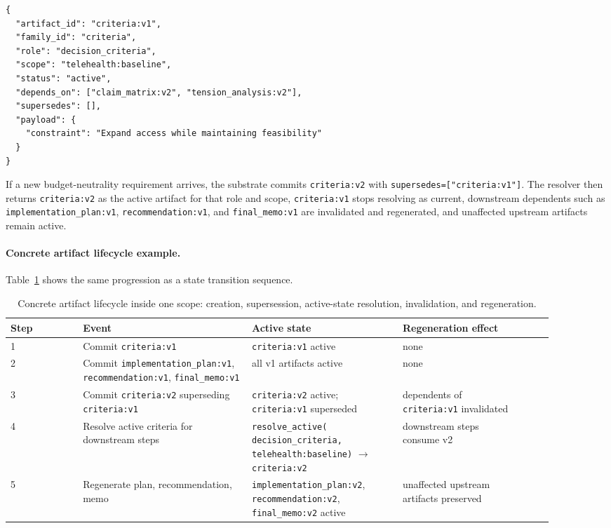 \documentclass{article}
\begin{document}
\begin{verbatim}
{
  "artifact_id": "criteria:v1",
  "family_id": "criteria",
  "role": "decision_criteria",
  "scope": "telehealth:baseline",
  "status": "active",
  "depends_on": ["claim_matrix:v2", "tension_analysis:v2"],
  "supersedes": [],
  "payload": {
    "constraint": "Expand access while maintaining feasibility"
  }
}
\end{verbatim}

If a new budget-neutrality requirement arrives, the substrate commits \texttt{criteria:v2} with \texttt{supersedes=["criteria:v1"]}. The resolver then returns \texttt{criteria:v2} as the active artifact for that role and scope, \texttt{criteria:v1} stops resolving as current, downstream dependents such as \texttt{implementation\_plan:v1}, \texttt{recommendation:v1}, and \texttt{final\_memo:v1} are invalidated and regenerated, and unaffected upstream artifacts remain active.

\paragraph{Concrete artifact lifecycle example.} Table~\ref{tab:lifecycle-example} shows the same progression as a state transition sequence.
\begin{table}[H]
\centering
\small
\begin{tabular}{p{0.12\linewidth}p{0.28\linewidth}p{0.25\linewidth}p{0.25\linewidth}}
\toprule
Step & Event & Active state & Regeneration effect \\
\midrule
1 & Commit \texttt{criteria:v1} & \texttt{criteria:v1} active & none \\
2 & Commit \texttt{implementation\_plan:v1}, \texttt{recommendation:v1}, \texttt{final\_memo:v1} & all v1 artifacts active & none \\
3 & Commit \texttt{criteria:v2} superseding \texttt{criteria:v1} & \shortstack[l]{\texttt{criteria:v2} active;\\\texttt{criteria:v1} superseded} & \shortstack[l]{dependents of\\\texttt{criteria:v1} invalidated} \\
4 & Resolve active criteria for downstream steps & \shortstack[l]{\texttt{resolve\_active(}\\\texttt{decision\_criteria,}\\\texttt{telehealth:baseline)}\\$\rightarrow$ \texttt{criteria:v2}} & \shortstack[l]{downstream steps\\consume v2} \\
5 & Regenerate plan, recommendation, memo & \shortstack[l]{\texttt{implementation\_plan:v2},\\\texttt{recommendation:v2},\\\texttt{final\_memo:v2} active} & \shortstack[l]{unaffected upstream\\artifacts preserved} \\
\bottomrule
\end{tabular}
\caption{Concrete artifact lifecycle inside one scope: creation, supersession, active-state resolution, invalidation, and regeneration.}
\label{tab:lifecycle-example}
\end{table}
\end{document}
